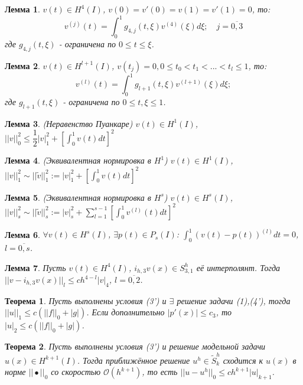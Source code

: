 \documentclass{article}
\newtheorem{theorem}{Теорема}
\newtheorem{lemma}{Лемма}
\begin{document}
\begin{lemma}
	$v(t) \in H^4(I)$, $v(0) = v'(0) = v(1) = v'(1) = 0$, то:
	\[
	v^{(j)}(t) = \int_0^1 g_{4,j}(t,\xi) v^{(4)}(\xi) d\xi; \quad j = \overline{0,3} 
	\]
	где $g_{4,j}(t,\xi)$ - ограничена по $ 0 \leqslant t \leqslant \xi$.
\end{lemma}

\begin{lemma}
	$v(t) \in H^{l+1}(I)$, $v(t_j) = 0, 0 \leqslant t_0 < t_1 < ... < t_l \leqslant 1$, то:
	\[
	v^{(l)}(t) = \int_0^1 g_{l+1}(t,\xi) v^{(l+1)}(\xi) d\xi;
	\]
	где $g_{l+1}(t,\xi)$ - ограничена по $ 0 \leqslant t,\xi \leqslant 1 $.
\end{lemma}

\begin{lemma}
	(Неравенство Пуанкаре)
	$v(t) \in H^1(I)$, $||v||_0^2 \leqslant \dfrac{1}{2} |v|_1^2 + [\int_0^1 v(t) dt]^2$
\end{lemma}

\begin{lemma}
	(Эквивалентная нормировка в $H^1$)
	$v(t) \in H^1(I)$, $||v||_1^2 \sim ||\tilde{v}||_1^2 := |v|_1^2 + [\int_0^1 v(t) dt]^2$
\end{lemma}

\begin{lemma}
	(Эквивалентная нормировка в $H^s$)
	$v(t) \in H^s(I)$, $||v||_s^2 \sim ||\tilde{v}||_s^2 := |v|_s^2 + \sum_{l = 1}^{s-1} [\int_0^1 v^{(l)}(t) dt]^2$
\end{lemma}


\begin{lemma}
	$\forall v(t) \in H^s(I)$, $\exists p(t) \in P_s(I)$: $\int_0^1 (v(t) - p(t))^{(l)} dt = 0$, $l = \overline{0,s}$.
\end{lemma}

\begin{lemma}
	Пусть $v(t) \in H^4(I)$, $i_{h,3} v(x) \in S_{3,1}^h $ её интерполянт. Тогда $||v - i_{h,3} v(x)||_l \leqslant c h^{4-l} |v|_4$, $l = \overline{0,2}$.
\end{lemma}


\begin{theorem}
	Пусть выполнены условия (3') и $\exists$ решение задачи (1),(4'), тогда $||u||_1 \leqslant c (||f||_0 + |g|)$. Если дополнительно $|p'(x)| \leqslant c_3$, то $|u|_2 \leqslant c (||f||_0 + |g|)$.
\end{theorem}

\begin{theorem}
	Пусть выполнены условия (3') и решение модельной задачи $u(x) \in H^{k+1} (I)$. Тогда приближённое решение $u^h \in \tilde{S}_k^h$ сходится к $u(x)$ в норме $||\bullet||_0$ со скоростью $\mathcal{O}(h^{k+1})$, то есть $||u - u^h||_0 \leqslant c h^{k+1} |u|_{k+1}$.
\end{theorem}
\end{document}
